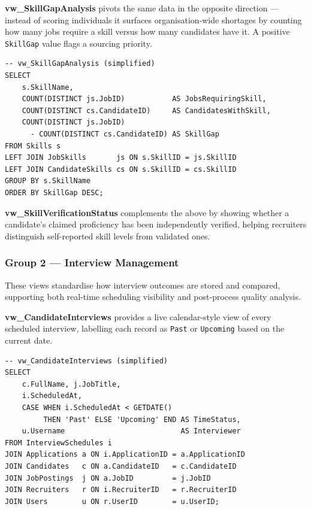 \documentclass[11pt,a4paper]{article}
\begin{document}
\textbf{vw\_SkillGapAnalysis} pivots the same data in the opposite direction — instead of scoring individuals it surfaces organisation-wide shortages by counting how many jobs require a skill versus how many candidates have it. A positive \texttt{SkillGap} value flags a sourcing priority.

\begin{verbatim}
-- vw_SkillGapAnalysis (simplified)
SELECT
    s.SkillName,
    COUNT(DISTINCT js.JobID)           AS JobsRequiringSkill,
    COUNT(DISTINCT cs.CandidateID)     AS CandidatesWithSkill,
    COUNT(DISTINCT js.JobID)
      - COUNT(DISTINCT cs.CandidateID) AS SkillGap
FROM Skills s
LEFT JOIN JobSkills       js ON s.SkillID = js.SkillID
LEFT JOIN CandidateSkills cs ON s.SkillID = cs.SkillID
GROUP BY s.SkillName
ORDER BY SkillGap DESC;
\end{verbatim}

\textbf{vw\_SkillVerificationStatus} complements the above by showing whether a candidate's claimed proficiency has been independently verified, helping recruiters distinguish self-reported skill levels from validated ones.

\subsubsection{Group 2 — Interview Management}

These views standardise how interview outcomes are stored and compared, supporting both real-time scheduling visibility and post-process quality analysis.

\textbf{vw\_CandidateInterviews} provides a live calendar-style view of every scheduled interview, labelling each record as \texttt{Past} or \texttt{Upcoming} based on the current date.

\begin{verbatim}
-- vw_CandidateInterviews (simplified)
SELECT
    c.FullName, j.JobTitle,
    i.ScheduledAt,
    CASE WHEN i.ScheduledAt < GETDATE()
         THEN 'Past' ELSE 'Upcoming' END AS TimeStatus,
    u.Username                           AS Interviewer
FROM InterviewSchedules i
JOIN Applications a ON i.ApplicationID = a.ApplicationID
JOIN Candidates   c ON a.CandidateID   = c.CandidateID
JOIN JobPostings  j ON a.JobID         = j.JobID
JOIN Recruiters   r ON i.RecruiterID   = r.RecruiterID
JOIN Users        u ON r.UserID        = u.UserID;
\end{verbatim}
\end{document}

